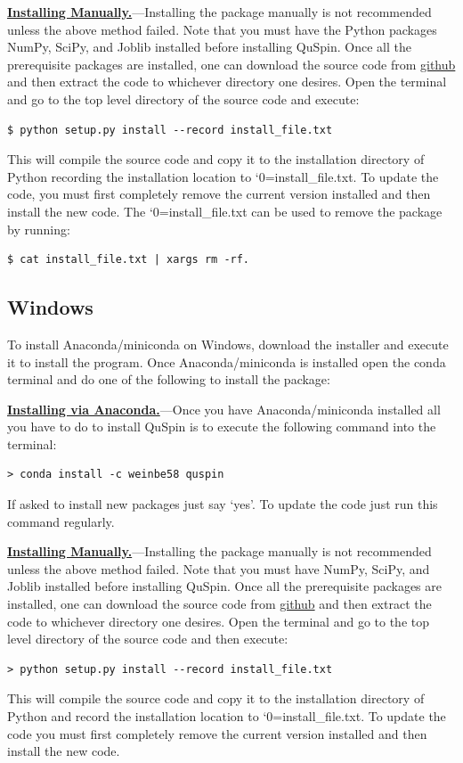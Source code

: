 \documentclass{SciPost}
\newcommand\0{\scalebox{-1}[1]{0}}
\let\svttfamily\ttfamily
\renewcommand\ttfamily{\svttfamily\catcode`0=\active }
\renewcommand\texttt{\bgroup\ttfamily\texttthelp}
\def\texttthelp#1{#1\egroup}
\begin{document}
\begin{appendix}
\underline{\bf Installing Manually.}---Installing the package manually is not recommended unless the above method failed. Note that you must have the Python packages NumPy, SciPy, and Joblib installed before installing QuSpin. Once all the prerequisite packages are installed, one can download the source code from \href{https://github.com/weinbe58/qspin/tree/master}{github} and then extract the code to whichever directory one desires. Open the terminal and go to the top level directory of the source code and execute:
\begin{lstlisting}[numbers=none,keywordstyle=\ttfamily]  
$ python setup.py install --record install_file.txt
\end{lstlisting}
This will compile the source code and copy it to the installation directory of Python recording the installation location to \texttt{install\_file.txt}. To update the code, you must first completely remove the current version installed and then install the new code. The \texttt{install\_file.txt} can be used to remove the package by running:  
\begin{lstlisting}[numbers=none,keywordstyle=\ttfamily]  
$ cat install_file.txt | xargs rm -rf. 
\end{lstlisting}

\subsection{Windows}
To install Anaconda/miniconda on Windows, download the installer and execute it to install the program. Once Anaconda/miniconda is installed open the conda terminal and do one of the following to install the package:

\underline{\bf Installing via Anaconda.}---Once you have Anaconda/miniconda installed all you have to do to install QuSpin is to execute the following command into the terminal: 
\begin{lstlisting}[numbers=none,keywordstyle=\ttfamily]
> conda install -c weinbe58 quspin
\end{lstlisting}
If asked to install new packages just say `yes'. To update the code just run this command regularly. 

\underline{\bf Installing Manually.}---Installing the package manually is not recommended unless the above method failed. Note that you must have NumPy, SciPy, and Joblib installed before installing QuSpin. Once all the prerequisite packages are installed, one can download the source code from \href{https://github.com/weinbe58/qspin/tree/master}{github} and then extract the code to whichever directory one desires. Open the terminal and go to the top level directory of the source code and then execute:  
\begin{lstlisting}[numbers=none,keywordstyle=\ttfamily]
> python setup.py install --record install_file.txt
\end{lstlisting}
This will compile the source code and copy it to the installation directory of Python and record the installation location to \texttt{install\_file.txt}. To update the code you must first completely remove the current version installed and then install the new code. 



\end{appendix}
\end{document}
